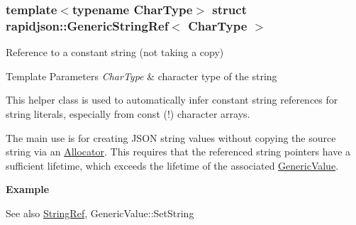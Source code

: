 \subsubsection*{template$<$typename Char\+Type$>$\newline
struct rapidjson\+::\+Generic\+String\+Ref$<$ Char\+Type $>$}

Reference to a constant string (not taking a copy) 


\begin{DoxyTemplParams}{Template Parameters}
{\em Char\+Type} & character type of the string\\
\hline
\end{DoxyTemplParams}
This helper class is used to automatically infer constant string references for string literals, especially from {\ttfamily const} {\bfseries{}}(!) character arrays.

The main use is for creating J\+S\+ON string values without copying the source string via an \mbox{\hyperlink{classrapidjson_1_1_allocator}{Allocator}}. This requires that the referenced string pointers have a sufficient lifetime, which exceeds the lifetime of the associated \mbox{\hyperlink{classrapidjson_1_1_generic_value}{Generic\+Value}}.

{\bfseries{Example}} 
\begin{DoxyCode}{0}
\DoxyCodeLine{}
\DoxyCodeLine{\textcolor{comment}{// Value x(bar); // not ok, can't rely on bar's lifetime}}
\end{DoxyCode}


\begin{DoxySeeAlso}{See also}
\mbox{\hyperlink{structrapidjson_1_1_generic_string_ref_aa6b9fd9f6aa49405a574c362ba9af6b5}{String\+Ref}}, Generic\+Value\+::\+Set\+String 
\end{DoxySeeAlso}


